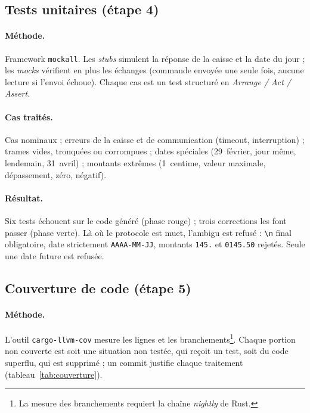 \documentclass[11pt,a4paper]{article}
\newcommand{\code}[1]{\texttt{\small #1}}
\begin{document}
\subsection{Tests unitaires (étape 4)}

\paragraph{Méthode.} Framework \code{mockall}. Les \emph{stubs} simulent la réponse de la
caisse et la date du jour ; les \emph{mocks} vérifient en plus les échanges (commande envoyée
une seule fois, aucune lecture si l'envoi échoue). Chaque cas est un test structuré en
\emph{Arrange / Act / Assert}.

\paragraph{Cas traités.} Cas nominaux ; erreurs de la caisse et de communication (timeout,
interruption) ; trames vides, tronquées ou corrompues ; dates spéciales (29~février, jour même,
lendemain, 31~avril) ; montants extrêmes (1~centime, valeur maximale, dépassement, zéro,
négatif).

\paragraph{Résultat.} Six tests échouent sur le code généré (phase rouge) ; trois corrections
les font passer (phase verte). Là où le protocole est muet, l'ambigu est refusé : \code{\textbackslash n}
final obligatoire, date strictement \code{AAAA-MM-JJ}, montants \code{145.} et \code{0145.50}
rejetés. Seule une date future est refusée.

\subsection{Couverture de code (étape 5)}

\paragraph{Méthode.} L'outil \code{cargo-llvm-cov} mesure les lignes et les
branchements\footnote{La mesure des branchements requiert la chaîne \emph{nightly} de Rust.}.
Chaque portion non couverte est soit une situation non testée, qui reçoit un test, soit du code
superflu, qui est supprimé ; un commit justifie chaque traitement
(tableau~\ref{tab:couverture}).
\end{document}
